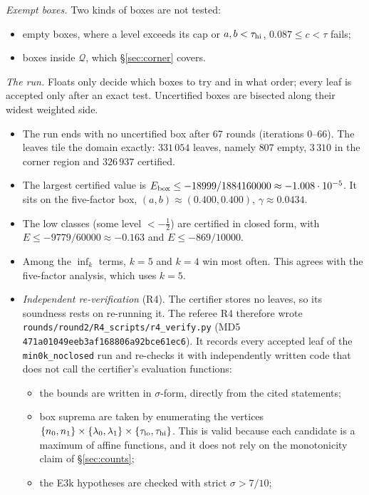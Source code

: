 \documentclass[11pt]{amsart}
\theoremstyle{definition}
\theoremstyle{remark}
\newcommand{\cQ}{\mathcal{Q}}
\begin{document}
\emph{Exempt boxes.} Two kinds of boxes are not tested:
\begin{itemize}[leftmargin=*]
\item empty boxes, where a level exceeds its cap or $a,b<\tau_{\rm hi}$, $0.087\le c<\tau$ fails;
\item boxes inside $\cQ$, which \S\ref{sec:corner} covers.
\end{itemize}

\emph{The run.} Floats only decide which boxes to try and in what order; every leaf is accepted only after an exact test. Uncertified boxes
are bisected along their widest weighted side.
\begin{itemize}[leftmargin=*]
\item The run ends with no uncertified box after 67 rounds (iterations 0--66). The leaves tile the domain exactly: $331\,054$ leaves, namely $807$ empty, $3\,310$ in
the corner region and $326\,937$ certified.
\item The largest certified value is $E_{\rm box}\le-18999/1884160000\approx-1.008\cdot10^{-5}$. It sits on the five-factor box,
$(a,b)\approx(0.400,0.400)$, $\gamma\approx0.0434$.
\item The low classes (some level $<-\frac12$) are certified in closed form, with $E\le-9779/60000\approx-0.163$ and $E\le-869/10000$.
\item Among the $\inf_k$ terms, $k=5$ and $k=4$ win most often. This agrees with the five-factor analysis, which uses $k=5$.
\item \emph{Independent re-verification} (R4). The certifier stores no leaves, so its soundness rests on re-running it. The referee R4 therefore wrote
\nolinkurl{rounds/round2/R4_scripts/r4_verify.py} (MD5 \texttt{471a01049eeb3af168806a92bce61ec6}). It records every accepted leaf of the
\texttt{min0k\_noclosed} run and re-checks it with independently written code that does not call the certifier's evaluation functions:
\begin{itemize}[leftmargin=*]
\item the bounds are written in $\sigma$-form, directly from the cited statements;
\item box suprema are taken by enumerating the vertices $\{n_0,n_1\}\times\{\lambda_0,\lambda_1\}\times\{\tau_{\rm lo},\tau_{\rm hi}\}$. This is valid because
each candidate is a maximum of affine functions, and it does not rely on the monotonicity claim of \S\ref{sec:counts};
\item the E3k hypotheses are checked with strict $\sigma>7/10$;

\end{itemize}
\end{itemize}
\end{document}
